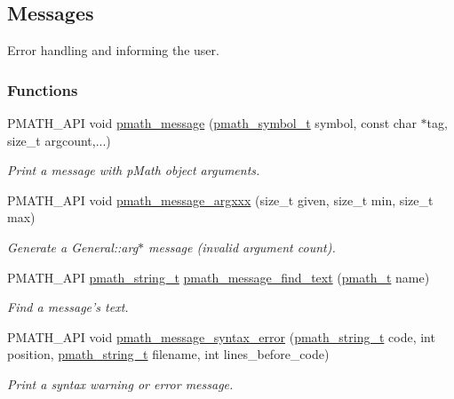 \hypertarget{group__messages}{
\subsection{Messages}
\label{group__messages}
}
Error handling and informing the user.  


\subsubsection*{Functions}
\begin{CompactItemize}
\item 
PMATH\_\-API void \hyperlink{group__messages_g0b94d5352ce3c6df0ca458d3c5cd7e15}{pmath\_\-message} (\hyperlink{classpmath__symbol__t}{pmath\_\-symbol\_\-t} symbol, const char $\ast$tag, size\_\-t argcount,...)
\begin{CompactList}\small\item\em Print a message with pMath object arguments. \item\end{CompactList}\item 
PMATH\_\-API void \hyperlink{group__messages_gc917f491312d93a2f437e287ec8baefe}{pmath\_\-message\_\-argxxx} (size\_\-t given, size\_\-t min, size\_\-t max)
\begin{CompactList}\small\item\em Generate a General::arg$\ast$ message (invalid argument count). \item\end{CompactList}\item 
PMATH\_\-API \hyperlink{classpmath__string__t}{pmath\_\-string\_\-t} \hyperlink{group__messages_g7759741a35c086736838a677b5facc21}{pmath\_\-message\_\-find\_\-text} (\hyperlink{classpmath__t}{pmath\_\-t} name)
\begin{CompactList}\small\item\em Find a message's text. \item\end{CompactList}\item 
PMATH\_\-API void \hyperlink{group__messages_g1091404d83f219f7e18a70642007be4a}{pmath\_\-message\_\-syntax\_\-error} (\hyperlink{classpmath__string__t}{pmath\_\-string\_\-t} code, int position, \hyperlink{classpmath__string__t}{pmath\_\-string\_\-t} filename, int lines\_\-before\_\-code)
\begin{CompactList}\small\item\em Print a syntax warning or error message. \item\end{CompactList}\end{CompactItemize}


